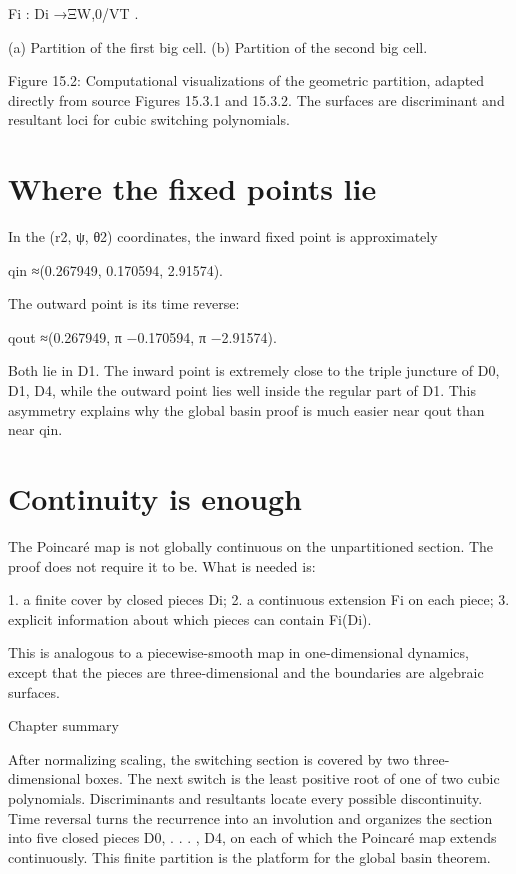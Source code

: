 Fi : Di →ΞW,0/VT .


(a) Partition of the first big cell. (b) Partition of the second big cell.


\begin{figureplaceholder}
Figure 15.2: Computational visualizations of the geometric partition, adapted directly from source Figures 15.3.1 and 15.3.2. The surfaces are discriminant and resultant loci for cubic switching polynomials.
\end{figureplaceholder}

\section{Where the fixed points lie}

In the (r2, ψ, θ2) coordinates, the inward fixed point is approximately


qin ≈(0.267949, 0.170594, 2.91574).


The outward point is its time reverse:


\begin{displaytext}
qout ≈(0.267949, π −0.170594, π −2.91574).
\end{displaytext}

Both lie in D1. The inward point is extremely close to the triple juncture of D0, D1, D4, while the outward point lies well inside the regular part of D1. This asymmetry explains why the global basin proof is much easier near qout than near qin.


\section{Continuity is enough}

The Poincaré map is not globally continuous on the unpartitioned section. The proof does not require it to be. What is needed is:


1. a finite cover by closed pieces Di; 2. a continuous extension Fi on each piece; 3. explicit information about which pieces can contain Fi(Di).


This is analogous to a piecewise-smooth map in one-dimensional dynamics, except that the pieces are three-dimensional and the boundaries are algebraic surfaces.


\begin{insightbox}{Chapter summary}
\end{insightbox}

After normalizing scaling, the switching section is covered by two three-dimensional boxes. The next switch is the least positive root of one of two cubic polynomials. Discriminants and resultants locate every possible discontinuity. Time reversal turns the recurrence into an involution and organizes the section into five closed pieces D0, . . . , D4, on each of which the Poincaré map extends continuously. This finite partition is the platform for the global basin theorem.

